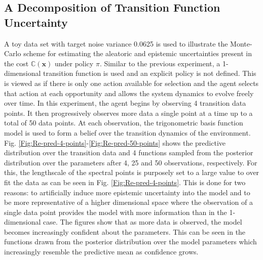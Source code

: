 \subsection{A Decomposition of Transition Function Uncertainty}
A toy data set with target noise variance 0.0625 is used to illustrate the Monte-Carlo scheme for estimating the aleatoric and epistemic uncertainties present in the cost $\mathbb{C}(\mathbf{x})$ under policy $\pi$. Similar to the previous experiment, a 1-dimensional transition function is used and an explicit policy is not defined. This is viewed as if there is only one action available for selection and the agent selects that action at each opportunity and allows the system dynamics to evolve freely over time. In this experiment, the agent begins by observing 4 transition data points. It then progressively observes more data a single point at a time up to a total of 50 data points. At each observation, the trigonometric basis function model is used to form a belief over the transition dynamics of the environment. Fig. \ref{Fig:Re-pred-4-points}-\ref{Fig:Re-pred-50-points} shows the predictive distribution over the transition data and 4 functions sampled from the posterior distribution over the parameters after 4, 25 and 50 observations, respectively. For this, the lengthscale of the spectral points is purposely set to a large value to over fit the data as can be seen in Fig. \ref{Fig:Re-pred-4-points}. This is done for two reasons: to artificially induce more epistemic uncertainty into the model and to be more representative of a higher dimensional space where the observation of a single data point provides the model with more information than in the 1-dimensional case. The figures show that as more data is observed, the model becomes increasingly confident about the parameters. This can be seen in the functions drawn from the posterior distribution over the model parameters which increasingly resemble the predictive mean as confidence grows. 

